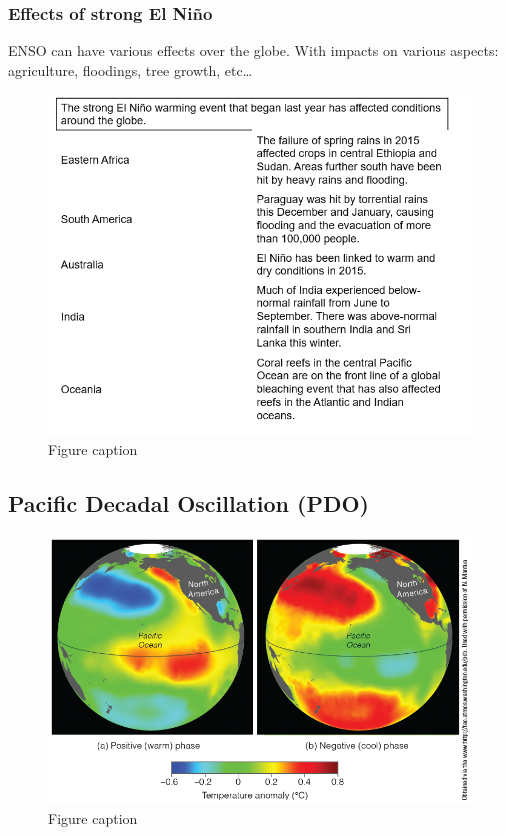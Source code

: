 \documentclass[12pt,oneside]{book}
\begin{document}
\subsubsection{Effects of strong El
Niño}\label{effects-of-strong-el-niuxf1o}

ENSO can have various effects over the globe. With impacts on various
aspects: agriculture, floodings, tree growth, etc\ldots{}

\begin{figure}

{\centering \includegraphics[width=0.8\linewidth]{figures/Figure533g} 

}

\caption{Figure caption}\label{fig:Fig533g}
\end{figure}

\subsection{Pacific Decadal Oscillation
(PDO)}\label{pacific-decadal-oscillation-pdo}

\begin{figure}

{\centering \includegraphics[width=0.8\linewidth]{figures/Figure534a} 

}

\caption{Figure caption}\label{fig:Fig534a}
\end{figure}
\end{document}

